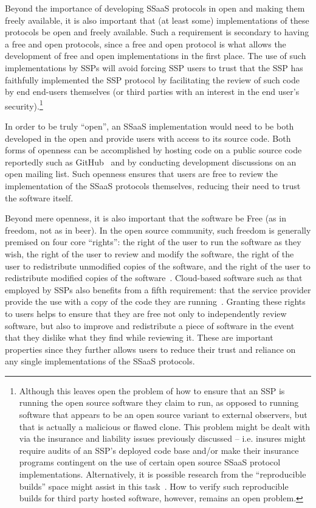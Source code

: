 Beyond the importance of developing SSaaS protocols in open and making
them freely available, it is also important that (at least some)
implementations of these protocols be open and freely available. Such
a requirement is secondary to having a free and open protocols, since
a free and open protocol is what allows the development of free and
open implementations in the first place. The use of such
implementations by SSPs will avoid forcing SSP users to trust that the
SSP has faithfully implemented the SSP protocol by facilitating the
review of such code by end end-users themselves (or third parties with
an interest in the end user's security).\footnote{Although this leaves
  open the problem of how to ensure that an SSP is running the open
  source software they claim to run, as opposed to running software
  that appears to be an open source variant to external observers, but
  that is actually a malicious or flawed clone. This problem might be
  dealt with via the insurance and liability issues previously
  discussed -- i.e. insures might require audits of an SSP's deployed
  code base and/or make their insurance programs contingent on the use
  of certain open source SSaaS protocol
  implementations. Alternatively, it is possible research from the
  ``reproducible builds'' space might assist in this
  task~\cite{DeCarnedeCarnavalet2014}. How to verify such reproducible
  builds for third party hosted software, however, remains an open
  problem.}

In order to be truly ``open'', an SSaaS implementation would need to
be both developed in the open and provide users with access to its
source code. Both forms of openness can be accomplished by hosting
code on a public source code reportedly such as GitHub~\cite{github}
and by conducting development discussions on an open mailing
list. Such openness ensures that users are free to review the
implementation of the SSaaS protocols themselves, reducing their need
to trust the software itself.

Beyond mere openness, it is also important that the software be Free
(as in freedom, not as in beer). In the open source community, such
freedom is generally premised on four core ``rights'': the right of
the user to run the software as they wish, the right of the user to
review and modify the software, the right of the user to redistribute
unmodified copies of the software, and the right of the user to
redistribute modified copies of the
software~\cite{fsf-freedomns}. Cloud-based software such as that
employed by SSPs also benefits from a fifth requirement: that the
service provider provide the use with a copy of the code they are
running~\cite{agpl}. Granting these rights to users helps to ensure
that they are free not only to independently review software, but also
to improve and redistribute a piece of software in the event that they
dislike what they find while reviewing it. These are important
properties since they further allows users to reduce their trust and
reliance on any single implementations of the SSaaS protocols.

